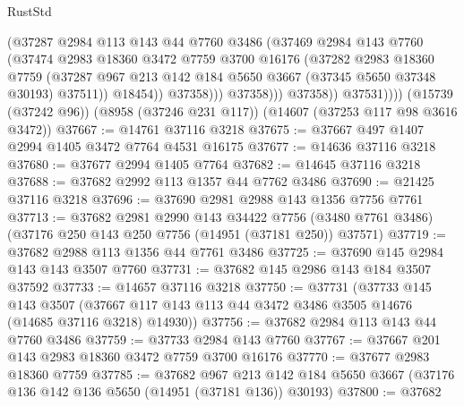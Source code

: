 \begin{lexlean}{RustStd}
\begin{coremodule}
                          (@37287
                            @2984
                            @113
                            @143
                            @44
                            @7760
                            @3486
                            (@37469
                              @2984
                              @143
                              @7760
                              (@37474
                                @2983
                                @18360
                                @3472
                                @7759
                                @3700
                                @16176
                                (@37282
                                  @2983
                                  @18360
                                  @7759
                                  (@37287
                                    @967
                                    @213
                                    @142
                                    @184
                                    @5650
                                    @3667
                                    (@37345 @5650 @37348 @30193)
                                    @37511))
                                @18454))
                            @37358)))
                      @37358)))
                @37358))
            @37531))))
    (@15739 (@37242 @96))
    (@8958 (@37246 @231 @117))
    (@14607 (@37253 @117 @98 @3616 @3472))
@37667 := @14761 @37116 @3218
@37675 := @37667 @497 @1407 @2994 @1405 @3472 @7764 @4531 @16175
@37677 := @14636 @37116 @3218
@37680 := @37677 @2994 @1405 @7764
@37682 := @14645 @37116 @3218
@37688 := @37682 @2992 @113 @1357 @44 @7762 @3486
@37690 := @21425 @37116 @3218
@37696 := @37690 @2981 @2988 @143 @1356 @7756 @7761
@37713 := @37682
    @2981
    @2990
    @143
    @34422
    @7756
    (@3480 @7761 @3486)
    (@37176 @250 @143 @250 @7756 (@14951 (@37181 @250)) @37571)
@37719 := @37682 @2988 @113 @1356 @44 @7761 @3486
@37725 := @37690 @145 @2984 @143 @143 @3507 @7760
@37731 := @37682 @145 @2986 @143 @184 @3507 @37592
@37733 := @14657 @37116 @3218
@37750 := @37731
    (@37733
      @145
      @143
      @3507
      (@37667 @117 @143 @113 @44 @3472 @3486 @3505 @14676 (@14685 @37116 @3218) @14930))
@37756 := @37682 @2984 @113 @143 @44 @7760 @3486
@37759 := @37733 @2984 @143 @7760
@37767 := @37667 @201 @143 @2983 @18360 @3472 @7759 @3700 @16176
@37770 := @37677 @2983 @18360 @7759
@37785 := @37682
    @967
    @213
    @142
    @184
    @5650
    @3667
    (@37176 @136 @142 @136 @5650 (@14951 (@37181 @136)) @30193)
@37800 := @37682

\end{coremodule}
\end{lexlean}

